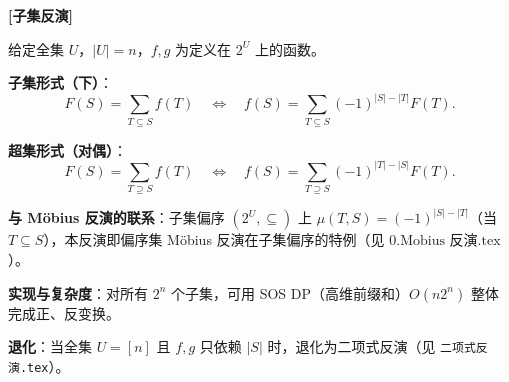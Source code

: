 \textbf{[子集反演]}

给定全集 $U$，$|U|=n$，$f,g$ 为定义在 $2^U$ 上的函数。

\textbf{子集形式（下）}：
\[
F(S) = \sum_{T\subseteq S} f(T)
\quad\Longleftrightarrow\quad
f(S) = \sum_{T\subseteq S} (-1)^{|S|-|T|} F(T).
\]

\textbf{超集形式（对偶）}：
\[
F(S) = \sum_{T\supseteq S} f(T)
\quad\Longleftrightarrow\quad
f(S) = \sum_{T\supseteq S} (-1)^{|T|-|S|} F(T).
\]

\textbf{与 Möbius 反演的联系}：子集偏序 $(2^U,\subseteq)$ 上 $\mu(T,S)=(-1)^{|S|-|T|}$（当 $T\subseteq S$），本反演即偏序集 Möbius 反演在子集偏序的特例（见 $0.\text{Mobius 反演.tex}$）。

\textbf{实现与复杂度}：对所有 $2^n$ 个子集，可用 SOS DP（高维前缀和）$O(n2^n)$ 整体完成正、反变换。

\textbf{退化}：当全集 $U=[n]$ 且 $f,g$ 只依赖 $|S|$ 时，退化为二项式反演（见 \texttt{二项式反演.tex}）。
